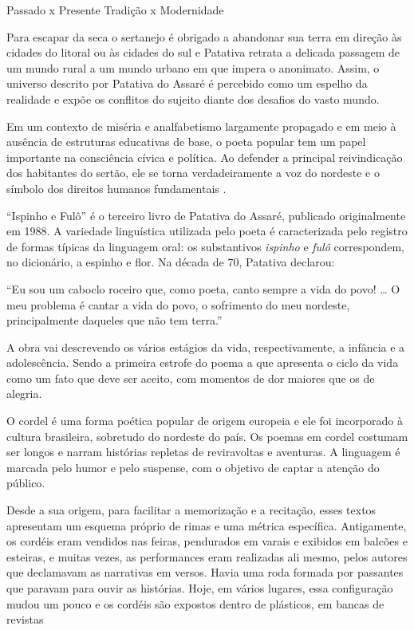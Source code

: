 \documentclass[12pt]{extarticle}
\begin{document}
Passado x Presente
Tradição x Modernidade

Para escapar da seca o sertanejo é obrigado a abandonar sua terra em direção às cidades do litoral 
ou às cidades do sul e Patativa retrata a delicada passagem de um mundo rural a um mundo urbano em 
que impera o anonimato. Assim, o universo descrito por Patativa do Assaré é percebido como um espelho 
da realidade e expõe os conflitos do sujeito diante dos desafios do vasto mundo. 

Em um contexto de miséria e analfabetismo largamente propagado e em meio à ausência de estruturas educativas 
de base, o poeta popular tem um papel importante na consciência cívica e política. Ao defender a principal 
reivindicação dos habitantes do sertão, ele se torna verdadeiramente a voz do nordeste e o símbolo dos direitos 
humanos fundamentais .

``Ispinho e Fulô'' é o terceiro livro de Patativa do Assaré, publicado originalmente em 1988. A variedade linguística 
utilizada pelo poeta é caracterizada pelo registro de formas típicas da linguagem oral: os substantivos \textit{ispinho} 
e \textit{fulô} correspondem, no dicionário, a espinho e flor. Na década de 70, Patativa declarou:

``Eu sou um caboclo roceiro que, como poeta, canto sempre a vida do povo! {}\ldots{} O meu problema é cantar a vida do 
povo, o sofrimento do meu nordeste, principalmente daqueles que não tem terra.''
 
A obra vai descrevendo os vários estágios da vida, respectivamente, a infância e a adolescência. Sendo a primeira estrofe do 
poema a que apresenta o ciclo da vida como um fato que deve ser aceito, com momentos de dor maiores que os de alegria.

O cordel é uma forma poética popular de origem europeia e ele foi incorporado à cultura brasileira, sobretudo do nordeste do 
país. Os poemas em cordel costumam ser longos e narram histórias repletas de reviravoltas e aventuras. A linguagem é marcada 
pelo humor e pelo suspense, com o objetivo de captar a atenção do público. 
 
Desde a sua origem, para facilitar a memorização e a recitação, esses textos apresentam um esquema próprio de rimas e uma métrica 
específica. Antigamente, os cordéis eram vendidos nas feiras, pendurados em varais e exibidos em balcões e esteiras, e muitas vezes, 
as performances eram realizadas ali mesmo, pelos autores que declamavam as narrativas em versos. Havia uma roda formada por passantes 
que paravam para ouvir as histórias. Hoje, em vários lugares, essa configuração mudou um pouco e os cordéis são expostos dentro de 
plásticos, em bancas de revistas
 
\end{document}
